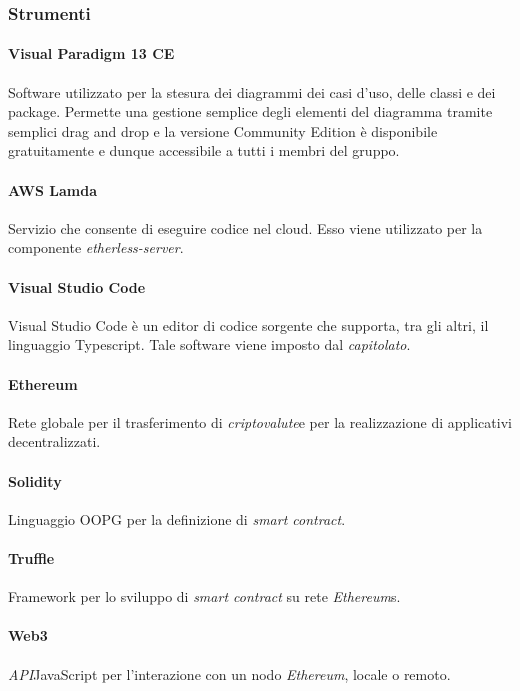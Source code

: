 \subsubsection{Strumenti}
\paragraph{Visual Paradigm 13 CE}
Software utilizzato per la stesura dei diagrammi dei casi d'uso, delle classi e dei package. Permette una gestione semplice degli elementi del diagramma tramite semplici drag and drop e la versione Community Edition è disponibile gratuitamente e dunque accessibile a tutti i membri del gruppo.

\paragraph{AWS Lamda}
Servizio che consente di eseguire codice nel cloud\glos. Esso viene utilizzato per la componente \textit{etherless-server}.

\paragraph{Visual Studio Code}
Visual Studio Code è un editor di codice sorgente che supporta, tra gli altri, il linguaggio Typescript. Tale software viene imposto dal \textit{capitolato\glos}.

\paragraph{Ethereum\glo}
Rete globale per il trasferimento di \textit{criptovalute}\glo e per la realizzazione di applicativi decentralizzati.

\paragraph{Solidity}
Linguaggio OOPG per la definizione di \textit{smart contract}\glos.

\paragraph{Truffle}
Framework per lo sviluppo di \textit{smart contract\glo} su rete \textit{Ethereum\glo}s.

\paragraph{Web3}
\textit{API}\glo JavaScript per l’interazione con un nodo \textit{Ethereum\glos}, locale o remoto.

